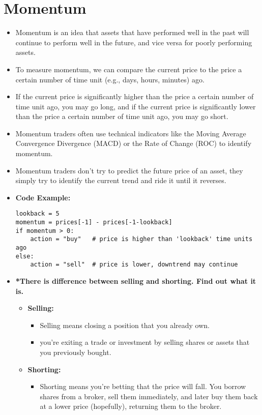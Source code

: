 \documentclass{article}
\begin{document}
\section*{Momentum}
\begin{itemize}
    \item Momentum is an idea that assets that have performed well in the past will continue to perform well in the future, and vice versa for poorly performing assets.
    \item To measure momentum, we can compare the current price to the price a certain number of time unit (e.g., days, hours, minutes) ago.
    \item If the current price is significantly higher than the price a certain number of time unit ago, you may go long, and if the current price is significantly lower than the price a certain number of time unit ago, you may go short.
    \item Momentum traders often use technical indicators like the Moving Average Convergence Divergence (MACD) or the Rate of Change (ROC) to identify momentum.
    \item Momentum traders don't try to predict the future price of an asset, they simply try to identify the current trend and ride it until it reverses.
    \item \textbf{Code Example:}
    \begin{lstlisting}
lookback = 5
momentum = prices[-1] - prices[-1-lookback]
if momentum > 0:
    action = "buy"   # price is higher than 'lookback' time units ago
else:
    action = "sell"  # price is lower, downtrend may continue
    \end{lstlisting}
    \item \textbf{*There is difference between selling and shorting. Find out what it is.}
    \begin{itemize}
        \item \textbf{Selling: }
        \begin{itemize}
            \item Selling means closing a position that you already own.
            \item you're exiting a trade or investment by selling shares or assets that you previously bought.
        \end{itemize}
        \item \textbf{Shorting: }
        \begin{itemize}
            \item Shorting means you're betting that the price will fall. You borrow shares from a broker, sell them immediately, and later buy them back at a lower price (hopefully), returning them to the broker.

\end{itemize}
\end{itemize}
\end{itemize}
\end{document}

